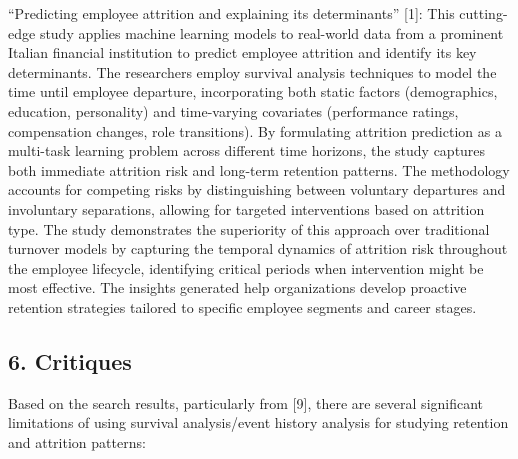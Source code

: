 \documentclass[./main.tex]{subfiles}
\begin{document}
``Predicting employee attrition and explaining its determinants''
{[}1{]}: This cutting-edge study applies machine learning models to
real-world data from a prominent Italian financial institution to
predict employee attrition and identify its key determinants. The
researchers employ survival analysis techniques to model the time until
employee departure, incorporating both static factors (demographics,
education, personality) and time-varying covariates (performance
ratings, compensation changes, role transitions). By formulating
attrition prediction as a multi-task learning problem across different
time horizons, the study captures both immediate attrition risk and
long-term retention patterns. The methodology accounts for competing
risks by distinguishing between voluntary departures and involuntary
separations, allowing for targeted interventions based on attrition
type. The study demonstrates the superiority of this approach over
traditional turnover models by capturing the temporal dynamics of
attrition risk throughout the employee lifecycle, identifying critical
periods when intervention might be most effective. The insights
generated help organizations develop proactive retention strategies
tailored to specific employee segments and career stages.

\subsection{6. Critiques}\label{critiques}

Based on the search results, particularly from {[}9{]}, there are
several significant limitations of using survival analysis/event history
analysis for studying retention and attrition patterns:
\end{document}
